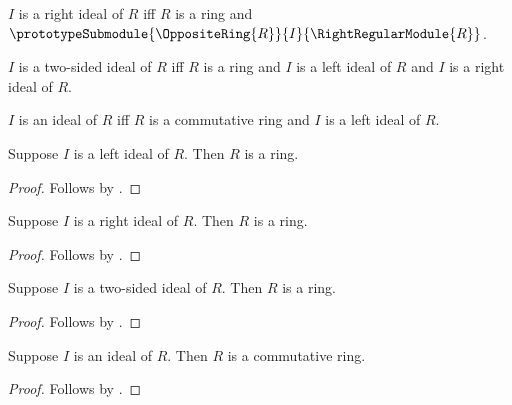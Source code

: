 \begin{definition}\label{spike_phrase_right_ideal}
    $I$ is a right ideal of $R$ iff
        $R$ is a ring and
        $\prototypeSubmodule{\OppositeRing{R}}{I}{
            \RightRegularModule{R}}$.
\end{definition}

\begin{definition}\label{spike_phrase_two_sided_ideal}
    $I$ is a two-sided ideal of $R$ iff
        $R$ is a ring and
        $I$ is a left ideal of $R$ and
        $I$ is a right ideal of $R$.
\end{definition}

\begin{definition}\label{spike_phrase_ideal}
    $I$ is an ideal of $R$ iff
        $R$ is a commutative ring and $I$ is a left ideal of $R$.
\end{definition}

\begin{proposition}\label{spike_phrase_left_ideal_guard}
    Suppose $I$ is a left ideal of $R$.
    Then $R$ is a ring.
\end{proposition}
\begin{proof}
    Follows by .
\end{proof}

\begin{proposition}\label{spike_phrase_right_ideal_guard}
    Suppose $I$ is a right ideal of $R$.
    Then $R$ is a ring.
\end{proposition}
\begin{proof}
    Follows by .
\end{proof}

\begin{proposition}\label{spike_phrase_two_sided_ideal_guard}
    Suppose $I$ is a two-sided ideal of $R$.
    Then $R$ is a ring.
\end{proposition}
\begin{proof}
    Follows by .
\end{proof}

\begin{proposition}\label{spike_phrase_ideal_guard}
    Suppose $I$ is an ideal of $R$.
    Then $R$ is a commutative ring.
\end{proposition}
\begin{proof}
    Follows by .
\end{proof}

